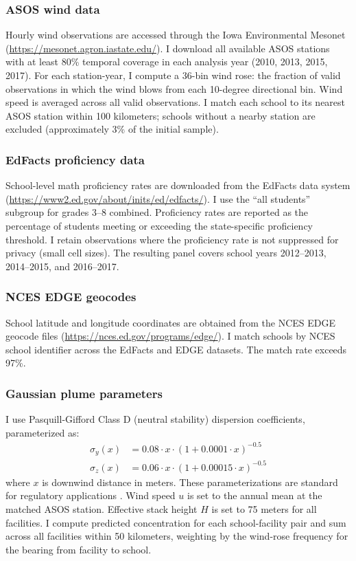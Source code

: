 \documentclass[12pt]{article}
\begin{document}
\subsubsection*{ASOS wind data} Hourly wind observations are accessed through the Iowa Environmental Mesonet (\url{https://mesonet.agron.iastate.edu/}). I download all available ASOS stations with at least 80\% temporal coverage in each analysis year (2010, 2013, 2015, 2017). For each station-year, I compute a 36-bin wind rose: the fraction of valid observations in which the wind blows from each 10-degree directional bin. Wind speed is averaged across all valid observations. I match each school to its nearest ASOS station within 100 kilometers; schools without a nearby station are excluded (approximately 3\% of the initial sample).

\subsubsection*{EdFacts proficiency data} School-level math proficiency rates are downloaded from the EdFacts data system (\url{https://www2.ed.gov/about/inits/ed/edfacts/}). I use the ``all students'' subgroup for grades 3--8 combined. Proficiency rates are reported as the percentage of students meeting or exceeding the state-specific proficiency threshold. I retain observations where the proficiency rate is not suppressed for privacy (small cell sizes). The resulting panel covers school years 2012--2013, 2014--2015, and 2016--2017.

\subsubsection*{NCES EDGE geocodes} School latitude and longitude coordinates are obtained from the NCES EDGE geocode files (\url{https://nces.ed.gov/programs/edge/}). I match schools by NCES school identifier across the EdFacts and EDGE datasets. The match rate exceeds 97\%.

\subsubsection*{Gaussian plume parameters} I use Pasquill-Gifford Class D (neutral stability) dispersion coefficients, parameterized as:
\begin{align}
\sigma_y(x) &= 0.08 \cdot x \cdot (1 + 0.0001 \cdot x)^{-0.5} \\
\sigma_z(x) &= 0.06 \cdot x \cdot (1 + 0.00015 \cdot x)^{-0.5}
\end{align}
where $x$ is downwind distance in meters. These parameterizations are standard for regulatory applications \citep{turner1994}. Wind speed $u$ is set to the annual mean at the matched ASOS station. Effective stack height $H$ is set to 75 meters for all facilities. I compute predicted concentration for each school-facility pair and sum across all facilities within 50 kilometers, weighting by the wind-rose frequency for the bearing from facility to school.
\end{document}
